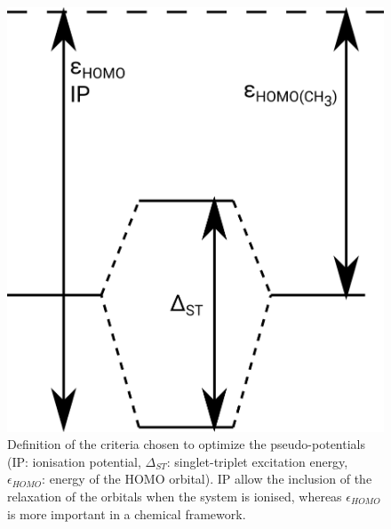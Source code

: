 \documentclass[12pt]{article}
\begin{document}

\clearpage

\begin{figure}
\begin{center}
\includegraphics[width=\columnwidth]{diagram.png}
\end{center}
\vspace{0.25in}
\hspace*{3in}
	\caption{Definition of the criteria chosen to optimize the pseudo-potentials
	(IP: ionisation potential, $\Delta_{ST}$: singlet-triplet excitation energy, $\epsilon_{HOMO}$: energy of the HOMO orbital).
	IP allow the inclusion of the relaxation of the orbitals when the system is ionised, whereas $\epsilon_{HOMO}$ is more important
	in a chemical framework.}
\label{figure:diagram}
\end{figure}
\end{document}
